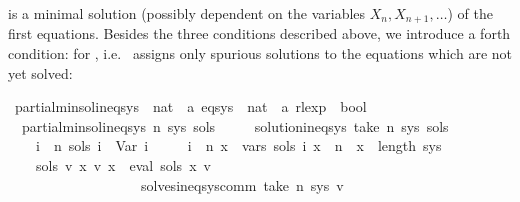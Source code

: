 \begin{isabellebody}
\begin{isamarkuptext}
 is a minimal solution (possibly dependent on the variables $X_n, X_{n+1}, \dots$) of
the first  equations. Besides the three conditions described above, we introduce a forth
condition:  for , i.e.\  assigns only spurious solutions to the
equations which are not yet solved:%
\end{isamarkuptext}\isamarkuptrue%
\isamarkupfalse%
\ partial{\isacharunderscore}{\kern0pt}min{\isacharunderscore}{\kern0pt}sol{\isacharunderscore}{\kern0pt}ineq{\isacharunderscore}{\kern0pt}sys\ {\isacharcolon}{\kern0pt}{\isacharcolon}{\kern0pt}\ {\isachardoublequoteopen}nat\ {\isasymRightarrow}\ {\isacharprime}{\kern0pt}a\ eq{\isacharunderscore}{\kern0pt}sys\ {\isasymRightarrow}\ {\isacharparenleft}{\kern0pt}nat\ {\isasymRightarrow}\ {\isacharprime}{\kern0pt}a\ rlexp{\isacharparenright}{\kern0pt}\ {\isasymRightarrow}\ bool{\isachardoublequoteclose}\ \isanewline
\ \ {\isachardoublequoteopen}partial{\isacharunderscore}{\kern0pt}min{\isacharunderscore}{\kern0pt}sol{\isacharunderscore}{\kern0pt}ineq{\isacharunderscore}{\kern0pt}sys\ n\ sys\ sols\ {\isasymequiv}\isanewline
\ \ \ \ solution{\isacharunderscore}{\kern0pt}ineq{\isacharunderscore}{\kern0pt}sys\ {\isacharparenleft}{\kern0pt}take\ n\ sys{\isacharparenright}{\kern0pt}\ sols\ {\isasymand}\isanewline
\ \ \ \ {\isacharparenleft}{\kern0pt}{\isasymforall}i\ {\isasymge}\ n{\isachardot}{\kern0pt}\ sols\ i\ {\isacharequal}{\kern0pt}\ Var\ i{\isacharparenright}{\kern0pt}\ {\isasymand}\isanewline
\ \ \ \ {\isacharparenleft}{\kern0pt}{\isasymforall}i\ {\isacharless}{\kern0pt}\ n{\isachardot}{\kern0pt}\ {\isasymforall}x\ {\isasymin}\ vars\ {\isacharparenleft}{\kern0pt}sols\ i{\isacharparenright}{\kern0pt}{\isachardot}{\kern0pt}\ x\ {\isasymge}\ n\ {\isasymand}\ x\ {\isacharless}{\kern0pt}\ length\ sys{\isacharparenright}{\kern0pt}\ {\isasymand}\isanewline
\ \ \ \ {\isacharparenleft}{\kern0pt}{\isasymforall}sols{\isacharprime}{\kern0pt}\ v{\isacharprime}{\kern0pt}{\isachardot}{\kern0pt}\ {\isacharparenleft}{\kern0pt}{\isasymforall}x{\isachardot}{\kern0pt}\ v{\isacharprime}{\kern0pt}\ x\ {\isacharequal}{\kern0pt}\ eval\ {\isacharparenleft}{\kern0pt}sols{\isacharprime}{\kern0pt}\ x{\isacharparenright}{\kern0pt}\ v{\isacharprime}{\kern0pt}{\isacharparenright}{\kern0pt}\isanewline
\ \ \ \ \ \ \ \ \ \ \ \ \ \ \ \ \ \ {\isasymand}\ solves{\isacharunderscore}{\kern0pt}ineq{\isacharunderscore}{\kern0pt}sys{\isacharunderscore}{\kern0pt}comm\ {\isacharparenleft}{\kern0pt}take\ n\ sys{\isacharparenright}{\kern0pt}\ v{\isacharprime}{\kern0pt}\isanewline

\end{isabellebody}
